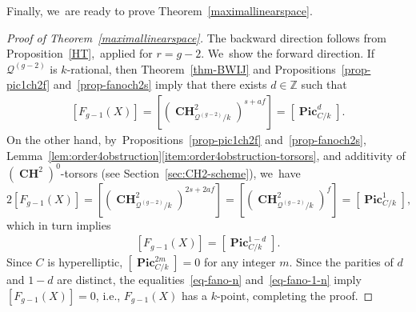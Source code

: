 \documentclass[JEP,XML,SOM,Unicode,NoEqCountersInSection,published]{cedram}
\theoremstyle{plain}
\theoremstyle{definition}
\DeclareMathOperator{\bCH}{\mathbf{CH}}
\DeclareMathOperator{\bPic}{\mathbf{Pic}}
\newcommand\Z{\mathbb{Z}}
\begin{document}
Finally, we~are ready to prove Theorem~\ref{maximallinearspace}.

\begin{proof}[Proof of Theorem~\ref{maximallinearspace}]
The backward direction follows from Proposition~\ref{HT},~applied for $r=g-2$. We~show the forward direction. If~$\mathcal{Q}^{(g-2)}$ is $k$\nobreakdash-rational, then
Theorem~\ref{thm-BWIJ} and Propositions~\ref{prop-pic1ch2f} and~\ref{prop-fanoch2s} imply that
there exists $d\in \Z$ such that
\begin{align}\label{eq-fano-n}
[F_{g-1}(X)]=[(\bCH^2_{\mathcal{Q}^{(g-2)}/k})^{s+af}]=[\bPic_{C/k}^d].
\end{align}
On the other hand, by~Propositions~\ref{prop-pic1ch2f} and~\ref{prop-fanoch2s},
Lemma~\ref{lem:order4obstruction}\eqref{item:order4obstruction-torsors}, and additivity of \((\bCH^2)^0\)-torsors (see Section~\ref{sec:CH2-scheme}), we~have
\[
2[F_{g-1}(X)]=[(\bCH^2_{\mathcal{Q}^{(g-2)}/k})^{2s+2af}]=[(\bCH^2_{\mathcal{Q}^{(g-2)}/k})^f]=[\bPic_{C/k}^1],
\]
which in turn implies
\begin{align}\label{eq-fano-1-n}
[F_{g-1}(X)]=[\bPic_{C/k}^{1-d}].
\end{align}
Since \(C\) is hyperelliptic, \([\bPic_{C/k}^{2m}]=0\) for any integer \(m\).
Since the parities of $d$ and $1-d$ are distinct,
the equalities~\eqref{eq-fano-n} and~\eqref{eq-fano-1-n} imply
$[F_{g-1}(X)]=0$, i.e., $F_{g-1}(X)$ has a \(k\)-point,
completing the proof.
\end{proof}
\end{document}
